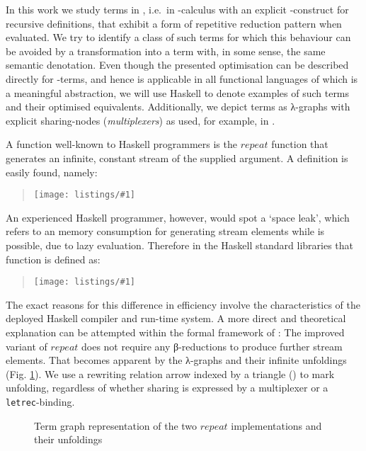 \documentclass[submission,copyright,creativecommons]{eptcs}
\newcommand{\letrec}{\texttt{letrec}}
\newcommand\listing[1]{\begin{quotation}\noindent\texttt{[image: listings/\#1]}\end{quotation}}
\newcommand\haskell[1]{\ensuremath{\mathit{#1}}}
\newcommand{\nbd}{\nobreakdash}
\newcommand{\nbde}{\nobreakdash-\hspace*{0pt}}
\renewcommand\;{\,}
\begin{document}
In this work we study terms in , i.e.\ in \nbde{}calculus with an explicit \nbde{}construct for recursive definitions,
that exhibit a form of repetitive reduction pattern when evaluated.
We try to identify a class of such terms
for which this behaviour can be avoided by a transformation into a term with,
in some sense, the same semantic denotation.
Even though the presented optimisation can be described directly for \nbd-terms, 
and hence is applicable in all functional languages of which  is a meaningful abstraction, 
we will use Haskell to denote examples of such terms and their optimised equivalents.
Additionally, we depict terms as λ-graphs with explicit
sharing-nodes (\textit{multiplexers}) as used, for example, in
\cite{AspertiGuerriniOptImpl}.



A function well-known to Haskell programmers is the \haskell{repeat} function that
generates an infinite, constant stream of the supplied argument. A definition
is easily found, namely: \listing{repeat}
An experienced Haskell programmer, however, would spot a `space leak',
which refers to an  memory consumption for generating  stream elements
while  is possible, due to lazy evaluation. Therefore in the Haskell
standard libraries that function is defined as: \listing{repeat_eff}
The exact reasons for this difference in efficiency involve the characteristics
of the deployed Haskell compiler and run-time system. A more direct and
theoretical explanation can be attempted within the formal framework of :
The improved variant of \haskell{repeat} does not require any β-reductions to
produce further stream elements. That becomes apparent by the λ-graphs and
their infinite unfoldings (Fig. \ref{repeat_graphs}). We use a rewriting
relation arrow indexed by a triangle () to mark unfolding,
regardless of whether sharing is expressed by a multiplexer or a
\letrec-binding.

\begin{figure}[htp]
\begin{center}
\hspace{1mm}\hspace{1mm}
\hspace{8mm}\hspace{8mm}
\hspace{1mm}\hspace{1mm}
\end{center}
\caption{\label{repeat_graphs}Term graph representation of the two \haskell{repeat} implementations and their unfoldings}
\end{figure}
\end{document}
